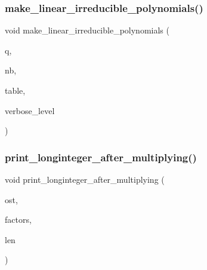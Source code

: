 \subsubsection{\texorpdfstring{make\+\_\+linear\+\_\+irreducible\+\_\+polynomials()}{make\_linear\_irreducible\_polynomials()}}
{\footnotesize\ttfamily void make\+\_\+linear\+\_\+irreducible\+\_\+polynomials (\begin{DoxyParamCaption}\item[{\mbox{\hyperlink{galois_8h_a09fddde158a3a20bd2dcadb609de11dc}{I\+NT}}}]{q,  }\item[{\mbox{\hyperlink{galois_8h_a09fddde158a3a20bd2dcadb609de11dc}{I\+NT}} \&}]{nb,  }\item[{\mbox{\hyperlink{galois_8h_a09fddde158a3a20bd2dcadb609de11dc}{I\+NT}} $\ast$\&}]{table,  }\item[{\mbox{\hyperlink{galois_8h_a09fddde158a3a20bd2dcadb609de11dc}{I\+NT}}}]{verbose\+\_\+level }\end{DoxyParamCaption})}

\mbox{\label{galois__global_8_c_aeaf4040aa0f04595845b317ed37ad903}} 
\subsubsection{\texorpdfstring{print\+\_\+longinteger\+\_\+after\+\_\+multiplying()}{print\_longinteger\_after\_multiplying()}}
{\footnotesize\ttfamily void print\+\_\+longinteger\+\_\+after\+\_\+multiplying (\begin{DoxyParamCaption}\item[{ostream \&}]{ost,  }\item[{\mbox{\hyperlink{galois_8h_a09fddde158a3a20bd2dcadb609de11dc}{I\+NT}} $\ast$}]{factors,  }\item[{\mbox{\hyperlink{galois_8h_a09fddde158a3a20bd2dcadb609de11dc}{I\+NT}}}]{len }\end{DoxyParamCaption})}

\mbox{\label{galois__global_8_c_a82d9792c3bb9e4dbcc4630b8c1242ee8}} 
